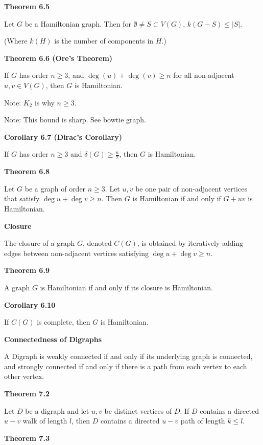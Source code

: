 \documentclass{article}
\begin{document}
\medskip\noindent\textbf{Theorem 6.5}

    Let $G$ be a Hamiltonian graph. Then for $\emptyset \neq S \subset V(G)$, $k(G-S) \leq |S|$.

    (Where $k(H)$ is the number of components in $H$.)

\medskip\noindent\textbf{Theorem 6.6 (Ore's Theorem)}

    If $G$ has order $n \geq 3$, and $\deg(u) + \deg(v) \geq n$ for all non-adjacent $u,v \in V(G)$, then $G$ is Hamiltonian.

    Note: $K_2$ is why $n \geq 3$.

    Note: This bound is sharp. See bowtie graph.

\medskip\noindent\textbf{Corollary 6.7 (Dirac's Corollary)}

    If $G$ has order $n \geq 3$ and $\delta(G) \geq \frac n2$, then $G$ is Hamiltonian.

\medskip\noindent\textbf{Theorem 6.8}

    Let $G$ be a graph of order $n \geq 3$. Let $u,v$ be one pair of non-adjacent vertices that satisfy $\deg u + \deg v \geq n$. Then $G$ is Hamiltonian if and only if $G+uv$ is Hamiltonian.

\medskip\noindent\textbf{Closure}

    The closure of a graph $G$, denoted $C(G)$, is obtained by iteratively adding edges between non-adjacent vertices satisfying $\deg u + \deg  v \geq n$.

\medskip\noindent\textbf{Theorem 6.9}

    A graph $G$ is Hamiltonian if and only if its closure is Hamiltonian.

\medskip\noindent\textbf{Corollary 6.10}

    If $C(G)$ is complete, then $G$ is Hamiltonian.

\medskip\noindent\textbf{Connectedness of Digraphs}

    A Digraph is weakly connected if and only if its underlying graph is connected, and strongly connected if and only if there is a path from each vertex to each other vertex.

\medskip\noindent\textbf{Theorem 7.2}

    Let $D$ be a digraph and let $u,v$ be distinct vertices of $D$.
    If $D$ contains a directed $u-v$ walk of length $l$, then $D$ contains a directed $u-v$ path of length $k \leq l$.

\medskip\noindent\textbf{Theorem 7.3}
\end{document}
